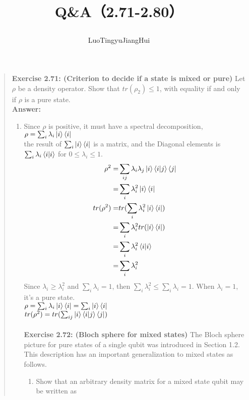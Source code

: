\documentclass[UTF8]{ctexart}
\begin{document}
	\title{\textbf{Q\&A（2.71-2.80）}\\[1ex]\begin{large}
		\end{large}}
	\author{LuoTingyu\quad JiangHui}
	\maketitle
\begin{quote}
\textbf{Exercise 2.71:  (Criterion to decide if a state is mixed or pure) } Let $\rho$ be a density operator. 
Show that $tr(\rho_{2}) \leq 1$, with equality if and only if $\rho$ is a pure state.
\\
\textbf{Answer:}\\
\begin{enumerate}
	\item 
	Since $\rho$ is positive, it must have a spectral decomposition,$\rho=\sum_{i}\lambda_{i}\ket{i}\bra{i} $\\
the result of $	\sum_{i}\ket{i}\bra{i}$ is a matrix, and the Diagonal elements is $\sum_{i}\lambda_{i}\bra{i}\ket{i}$ for $0\leq \lambda_{i}\leq 1$.
\begin{equation}
	\begin{aligned}
	 \rho^{2}=&\sum_{ij}\lambda_{i}\lambda_{j}\ket{i}\bra{i}\ket{j}\bra{j} \\
			 =&\sum_{i}\lambda_{i}^{2}\ket{i}\bra{i} \\
			 tr(\rho^{2})=&tr(\sum_{i}\lambda_{i}^{2}\ket{i}\bra{i} )\\
					=&\sum_{i}\lambda_{i}^{2}tr(\ket{i}\bra{i}) \\
					=&\sum_{i}\lambda_{i}^{2}\bra{i}\ket{i} \\
					=&\sum_{i}\lambda_{i}^{2}
	\end{aligned}
\end{equation} 
Since $\lambda_{i} \geq \lambda_{i}^{2}$ and $\sum_{i}\lambda_{i}=1$, then $\sum_{i}\lambda_{i}^{2}\leq \sum_{i}\lambda_{i} =1$.
When $\lambda_{i}=1$, it's a pure state. \\
$\rho =\sum_{i}\lambda_{i}\ket{i}\bra{i}= \sum_{i}\ket{i}\bra{i}$\\
$tr(\rho^{2})=tr(\sum_{ij}\ket{i}\bra{i}\ket{j}\bra{j})$
\\
\\
\textbf{Exercise 2.72: (Bloch sphere for mixed states)  } The Bloch sphere picture for pure states of a single qubit was introduced in Section 1.2. This description has an important generalization to mixed states as follows.
\begin{enumerate}
	\item Show that an arbitrary density matrix for a mixed state qubit may be written as


\end{enumerate}
\end{enumerate}
\end{quote}
\end{document}
